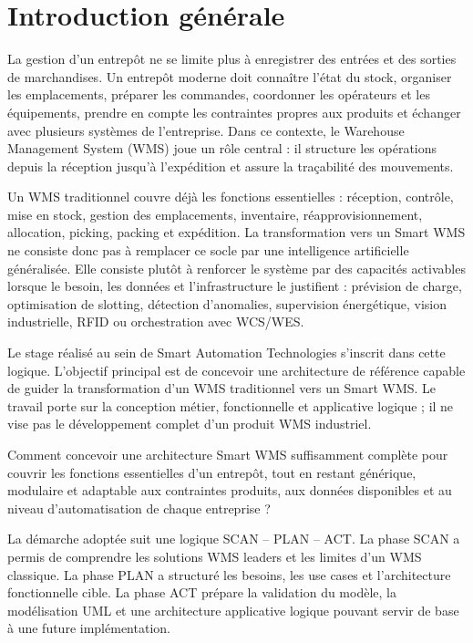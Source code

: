 \chapter*{Introduction générale}
La gestion d'un entrepôt ne se limite plus à enregistrer des entrées et des sorties de marchandises. Un entrepôt moderne doit connaître l'état du stock, organiser les emplacements, préparer les commandes, coordonner les opérateurs et les équipements, prendre en compte les contraintes propres aux produits et échanger avec plusieurs systèmes de l'entreprise. Dans ce contexte, le Warehouse Management System (WMS) joue un rôle central : il structure les opérations depuis la réception jusqu'à l'expédition et assure la traçabilité des mouvements.

Un WMS traditionnel couvre déjà les fonctions essentielles : réception, contrôle, mise en stock, gestion des emplacements, inventaire, réapprovisionnement, allocation, picking, packing et expédition. La transformation vers un Smart WMS ne consiste donc pas à remplacer ce socle par une intelligence artificielle généralisée. Elle consiste plutôt à renforcer le système par des capacités activables lorsque le besoin, les données et l'infrastructure le justifient : prévision de charge, optimisation de slotting, détection d'anomalies, supervision énergétique, vision industrielle, RFID ou orchestration avec WCS/WES.

Le stage réalisé au sein de Smart Automation Technologies s'inscrit dans cette logique. L'objectif principal est de concevoir une architecture de référence capable de guider la transformation d'un WMS traditionnel vers un Smart WMS. Le travail porte sur la conception métier, fonctionnelle et applicative logique ; il ne vise pas le développement complet d'un produit WMS industriel.

\begin{problematique}
Comment concevoir une architecture Smart WMS suffisamment complète pour couvrir les fonctions essentielles d'un entrepôt, tout en restant générique, modulaire et adaptable aux contraintes produits, aux données disponibles et au niveau d'automatisation de chaque entreprise ?
\end{problematique}

La démarche adoptée suit une logique SCAN -- PLAN -- ACT. La phase SCAN a permis de comprendre les solutions WMS leaders et les limites d'un WMS classique. La phase PLAN a structuré les besoins, les use cases et l'architecture fonctionnelle cible. La phase ACT prépare la validation du modèle, la modélisation UML et une architecture applicative logique pouvant servir de base à une future implémentation.
